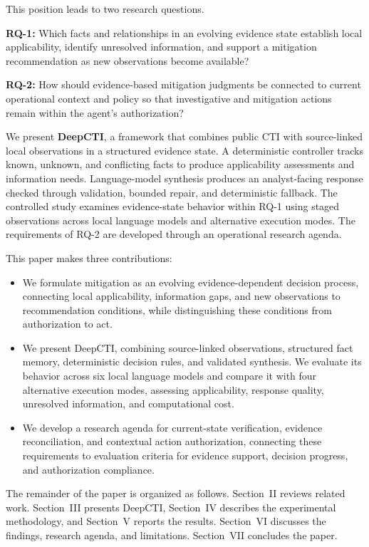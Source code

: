 \documentclass[conference]{IEEEtran}
\begin{document}
This position leads to two research questions.

\textbf{RQ-1:}
Which facts and relationships in an evolving evidence state establish
local applicability, identify unresolved information, and support a
mitigation recommendation as new observations become available?

\textbf{RQ-2:}
How should evidence-based mitigation judgments be connected to current
operational context and policy so that investigative and mitigation
actions remain within the agent's authorization?

We present \textbf{DeepCTI}, a framework that combines public CTI with
source-linked local observations in a structured evidence state.
A deterministic controller tracks known, unknown, and conflicting
facts to produce applicability assessments and information needs.
Language-model synthesis produces an analyst-facing response checked
through validation, bounded repair, and deterministic fallback.
The controlled study examines evidence-state behavior within RQ-1
using staged observations across local language models and alternative
execution modes. The requirements of RQ-2 are developed through an
operational research agenda.

This paper makes three contributions:
\begin{itemize}
    \item We formulate mitigation as an evolving evidence-dependent
    decision process, connecting local applicability, information gaps,
    and new observations to recommendation conditions, while
    distinguishing these conditions from authorization to act.

    \item We present DeepCTI, combining source-linked observations,
    structured fact memory, deterministic decision rules, and validated
    synthesis. We evaluate its behavior across six local language models
    and compare it with four alternative execution modes, assessing
    applicability, response quality, unresolved information, and
    computational cost.

    \item We develop a research agenda for current-state verification,
    evidence reconciliation, and contextual action authorization,
    connecting these requirements to evaluation criteria for evidence
    support, decision progress, and authorization compliance.
\end{itemize}

The remainder of the paper is organized as follows. Section~II reviews
related work. Section~III presents DeepCTI, Section~IV describes the
experimental methodology, and Section~V reports the results.
Section~VI discusses the findings, research agenda, and limitations.
Section~VII concludes the paper.
\end{document}
